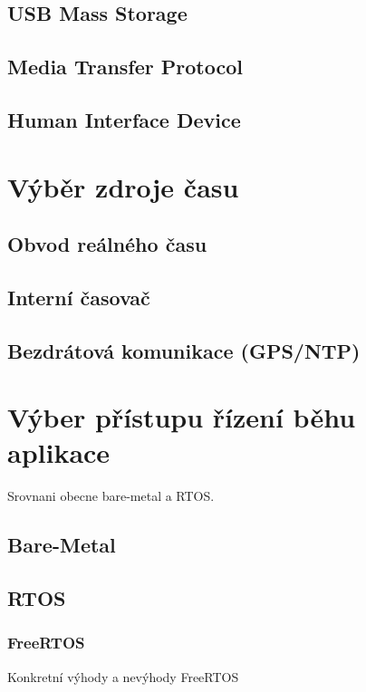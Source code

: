 \subsection{USB Mass Storage}

\subsection{Media Transfer Protocol}

\subsection{Human Interface Device}

\section{Výběr zdroje času}

\subsection{Obvod reálného času}

\subsection{Interní časovač}

\subsection{Bezdrátová komunikace (GPS/NTP)}

\section{Výber přístupu řízení běhu aplikace}
Srovnani obecne bare-metal a RTOS.


\subsection{Bare-Metal}

\subsection{RTOS}
\subsubsection{FreeRTOS}
Konkretní výhody a nevýhody FreeRTOS

